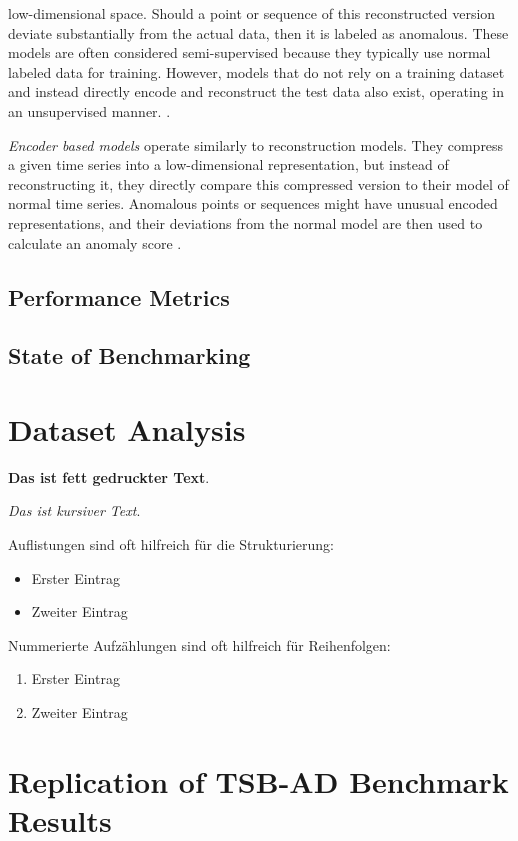 \documentclass[12pt,oneside]{article}
\begin{document}
low-dimensional space. Should a point or sequence of this reconstructed version deviate substantially from the actual data, then it is labeled as anomalous. These models are often considered semi-supervised because they typically use normal labeled data for training. However, models that do not rely on a training dataset and instead directly encode and reconstruct the test data also exist, operating in an unsupervised manner. \parencites[p.~5]{SchmidlEtAl2022Anomaly}. \par \textit{Encoder based models} operate similarly to reconstruction models. They compress a given time series into a low-dimensional representation, but instead of reconstructing it, they directly compare this compressed version to their model of normal time series. Anomalous points or sequences might have unusual encoded representations, and their deviations from the normal model are then used to calculate an anomaly score \parencites[p.~5-6]{SchmidlEtAl2022Anomaly}.
\subsection{Performance Metrics}

\subsection{State of Benchmarking}

\section{Dataset Analysis}

\textbf{Das ist fett gedruckter Text}.

\textit{Das ist kursiver Text}.


Auflistungen sind oft hilfreich für die Strukturierung:
\begin{itemize}
    \item Erster Eintrag
    \item Zweiter Eintrag
\end{itemize}

Nummerierte Aufzählungen sind oft hilfreich für Reihenfolgen:
\begin{enumerate}
    \item Erster Eintrag
    \item Zweiter Eintrag
\end{enumerate}

\section{Replication of TSB-AD Benchmark Results}
\end{document}
